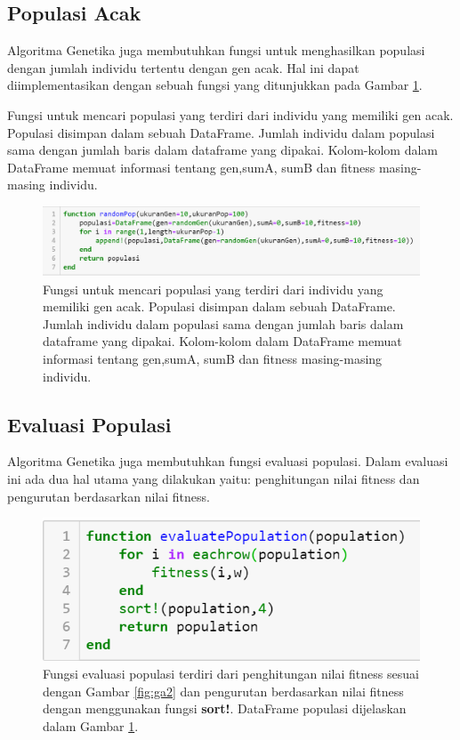 \documentclass[12pt,a4paper]{memoir}
\begin{document}
\subsection{Populasi Acak}
Algoritma Genetika juga membutuhkan fungsi untuk menghasilkan populasi dengan jumlah individu tertentu dengan gen acak. Hal ini dapat diimplementasikan dengan sebuah fungsi yang ditunjukkan pada Gambar \ref{fig:ga4}.

Fungsi untuk mencari populasi yang terdiri dari individu yang memiliki gen acak. Populasi disimpan dalam sebuah DataFrame. Jumlah individu dalam populasi sama dengan jumlah baris dalam dataframe yang dipakai. Kolom-kolom dalam DataFrame memuat informasi tentang gen,sumA, sumB dan fitness masing-masing individu.
\begin{figure}[h]
	\centering
	\includegraphics[width=\linewidth]{images/ga4}
	\caption{Fungsi untuk mencari populasi yang terdiri dari individu yang memiliki gen acak. Populasi disimpan dalam sebuah DataFrame. Jumlah individu dalam populasi sama dengan jumlah baris dalam dataframe yang dipakai. Kolom-kolom dalam DataFrame memuat informasi tentang gen,sumA, sumB dan fitness masing-masing individu.}
	\label{fig:ga4}
\end{figure}


\subsection{Evaluasi Populasi}
Algoritma Genetika juga membutuhkan fungsi evaluasi populasi. Dalam evaluasi ini ada dua hal utama yang dilakukan yaitu: penghitungan nilai fitness dan pengurutan berdasarkan nilai fitness.

\begin{figure}[h]
	\centering
	\includegraphics[width=0.7\linewidth]{images/ga5}
	\caption{Fungsi evaluasi populasi terdiri dari penghitungan nilai fitness sesuai dengan Gambar \ref{fig:ga2} dan pengurutan berdasarkan nilai fitness dengan menggunakan fungsi \textbf{sort!}. DataFrame populasi dijelaskan dalam Gambar \ref{fig:ga4}.}
	\label{fig:ga5}
\end{figure}
\end{document}
